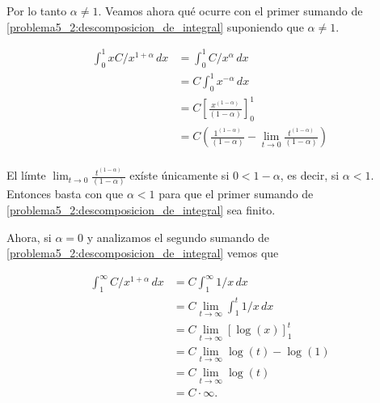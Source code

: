 Por lo tanto $\alpha \not= 1$. Veamos ahora qué ocurre con el primer sumando de \eqref{problema5_2:descomposicion_de_integral}
suponiendo que $\alpha \not= 1$.

\begin{align}
    \int_0^1 x C/x^{1+\alpha} \,dx  &=  \int_0^1 C/x^{\alpha}   \,dx                                                                                    \\
                                    &=  C \int_0^1 x^{-\alpha} \,dx                                                                                     \\
                                    &=  C \left[ \frac{x^{(1-\alpha)}}{(1-\alpha)}\right]_0^1                                                           \\
                                    &=  C \left( \frac{1^{(1-\alpha)}}{(1-\alpha)} - \lim_{t \rightarrow 0}\frac{t^{(1-\alpha)}}{(1-\alpha)}\right)     \\
\end{align}\pn

El límte $\lim_{t \rightarrow 0}\frac{t^{(1-\alpha)}}{(1-\alpha)}$ exíste únicamente si $0 < 1-\alpha$, es decir, si $\alpha < 1$. Entonces basta con 
que $\alpha < 1$ para que el primer sumando de \eqref{problema5_2:descomposicion_de_integral} sea finito.\pn

Ahora, si $\alpha = 0$ y analizamos el segundo sumando de \eqref{problema5_2:descomposicion_de_integral} vemos que

\begin{align}
    \int_1^\infty C/x^{1+\alpha} \,dx   &=  C \int_1^\infty 1/x \,dx                                            \\ 
                                        &=  C \lim_{t \rightarrow \infty} \int_1^t 1/x \,dx                     \\ 
                                        &=  C \lim_{t \rightarrow \infty} \left[ \log(x) \right]_1^t            \\ 
                                        &=  C \lim_{t \rightarrow \infty} \log(t) - \log(1)                     \\ 
                                        &=  C \lim_{t \rightarrow \infty} \log(t)                               \\ 
                                        &=  C \cdot \infty.                                                       
\end{align}

